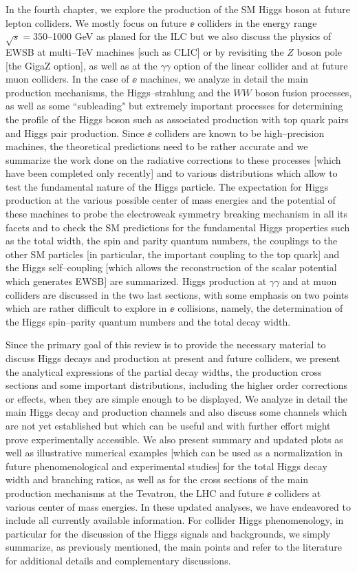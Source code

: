 In the fourth chapter, we explore the production of the SM Higgs boson at
future lepton colliders. We mostly focus on future $\ee$ colliders in the
energy range $\sqrt{s}=350$--1000 GeV as planed for the ILC but we also discuss
the physics of EWSB at multi--TeV machines [such as CLIC] or by revisiting the
$Z$ boson pole [the GigaZ option], as well as at the $\gamma \gamma$ option of
the linear collider and at future muon colliders.  In the case of $\ee$
machines, we analyze in detail the main production mechanisms, the
Higgs--strahlung and the $WW$ boson fusion processes, as well as some
``subleading" but extremely important processes for determining the profile of
the Higgs boson such as associated production with top quark pairs and  Higgs
pair production.  Since $\ee$ colliders are known to be high--precision
machines, the theoretical predictions need to be rather accurate and we
summarize the work done on the radiative corrections to these processes [which
have been completed only recently] and to various distributions which allow to
test the fundamental nature of the Higgs particle.  The expectation for Higgs
production at the various possible center of mass energies and the potential of
these machines to probe the electroweak symmetry breaking mechanism in all its
facets and to check the SM predictions for the fundamental Higgs properties
such as the total width, the spin and  parity quantum numbers, the couplings to
the other SM particles [in particular, the important coupling to the top quark]
and the Higgs self--coupling [which allows the reconstruction of the scalar
potential which generates EWSB] are summarized. Higgs production at $\gamma
\gamma$ and at muon colliders are discussed in the two last sections, with some
emphasis on two points which are rather difficult to explore in $\ee$
collisions, namely, the determination of the Higgs spin--parity quantum numbers
and the total decay width.\s 

Since the primary goal of this review is to provide the necessary material to
discuss Higgs decays and production at present and future colliders, we present
the analytical expressions of the partial decay widths, the production cross
sections and some important distributions, including the higher order
corrections or effects, when they are simple enough to be displayed.  We
analyze in detail the main Higgs decay and production channels and also discuss
some channels which are not yet established but which can be useful and with
further effort might prove experimentally accessible. We also present summary
and updated plots as well as illustrative numerical examples [which can be used
as a normalization in future phenomenological and experimental studies] for the
total Higgs decay width and branching ratios, as well as for the cross sections
of the main production mechanisms at the Tevatron, the LHC and future $\ee$
colliders at various center of mass energies. In these updated analyses, we have
endeavored to include all currently available information. For collider Higgs
phenomenology, in particular for the discussion of the Higgs signals and
backgrounds, we  simply summarize, as previously mentioned, the main points and
refer to the literature for additional details and complementary discussions.  

